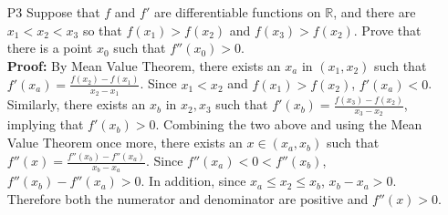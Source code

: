 \documentclass{article}
\begin{document}
\begin{itemize}
    \item [P3] Suppose that $f$ and $f'$ are differentiable functions on $\mathbb{R}$, and there are $x_1<x_2<x_3$ so that $f(x_1)>f(x_2)$ and $f(x_3)>f(x_2)$. Prove that there is a point $x_0$ such that $f''(x_0)>0$.\\\textbf{Proof: } By Mean Value Theorem, there exists an $x_a$ in $(x_1,x_2)$ such that $f'(x_a)=\frac{f(x_2)-f(x_1)}{x_2-x_1}$. Since $x_1<x_2$ and $f(x_1)>f(x_2)$, $f'(x_a)<0$. Similarly, there exists an $x_b$ in $x_2,x_3$ such that $f'(x_b)=\frac{f(x_3)-f(x_2)}{x_3-x_2}$, implying that $f'(x_b)>0$. Combining the two above and using the Mean Value Theorem once more, there exists an $x\in(x_a,x_b)$ such that $f''(x)=\frac{f''(x_b)-f''(x_a)}{x_b-x_a}$. Since $f''(x_a)<0<f''(x_b)$, $f''(x_b)-f''(x_a)>0$. In addition, since $x_a\leq x_2\leq x_b$, $x_b-x_a>0$. Therefore both the numerator and denominator are positive and $f''(x)>0$.
\end{itemize}
\end{document}
